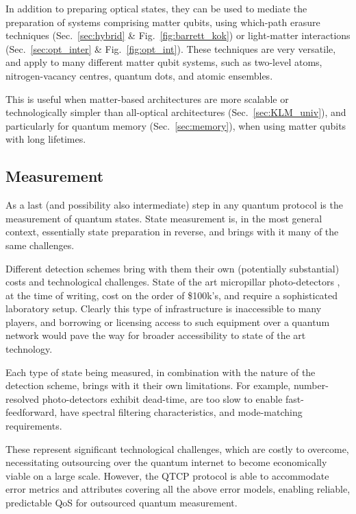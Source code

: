 \documentclass[aps, rmp, twocolumn, amsmath, amssymb, nofootinbib, superscriptaddress, longbibliography, floatfix, table-of-contents, eqsecnum]{revtex4-1}
\newcommand{\comment}[1]{{\color{blue}{\textbf{#1}}}}
\begin{document}
In addition to preparing optical states, they can be used to mediate the preparation of systems comprising matter qubits, using which-path erasure techniques (Sec.~\ref{sec:hybrid} \& Fig.~\ref{fig:barrett_kok}) or light-matter interactions (Sec.~\ref{sec:opt_inter} \& Fig.~\ref{fig:opt_int}). These techniques are very versatile, and apply to many different matter qubit systems, such as two-level atoms, nitrogen-vacancy centres, quantum dots, and atomic ensembles.

This is useful when matter-based architectures are more scalable or technologically simpler than all-optical architectures (Sec.~\ref{sec:KLM_univ}), and particularly for quantum memory (Sec.~\ref{sec:memory}), when using matter qubits with long lifetimes.

%
%

\subsection{Measurement} 

As a last (and possibility also intermediate) step in any quantum protocol is the measurement of quantum states. State measurement is, in the most general context, essentially state preparation in reverse, and brings with it many of the same challenges.

Different detection schemes bring with them their own (potentially substantial) costs and technological challenges. State of the art micropillar photo-detectors \cite{???}, at the time of writing, cost on the order of \$100k's, and require a sophisticated laboratory setup. Clearly this type of infrastructure is inaccessible to many players, and borrowing or licensing access to such equipment over a quantum network would pave the way for broader accessibility to state of the art technology.

Each type of state being measured, in combination with the nature of the detection scheme, brings with it their own limitations. For example, number-resolved photo-detectors exhibit dead-time, are too slow to enable fast-feedforward, have spectral filtering characteristics, and mode-matching requirements. \comment{Is this right?}

These represent significant technological challenges, which are costly to overcome, necessitating outsourcing over the quantum internet to become economically viable on a large scale. However, the QTCP protocol is able to accommodate error metrics and attributes covering all the above error models, enabling reliable, predictable QoS for outsourced quantum measurement.
\end{document}
